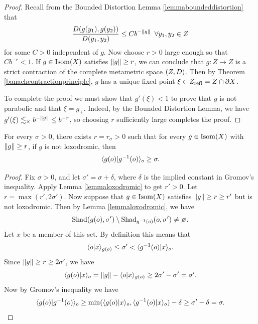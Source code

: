 \begin{proof}
Recall from the Bounded Distortion Lemma \ref{lemmaboundeddistortion} that
\begin{equation}
\label{equationloxodromic}
\frac{D(g(y_1),g(y_2))}{D(y_1,y_2)} \leq C b^{-\|g\|} \;\;\forall y_1,y_2\in Z
\end{equation}
for some $C > 0$ independent of $g$. Now choose $r > 0$ large enough so that $C b^{-r} < 1$. If $g\in\operatorname{Isom}(X)$ satisfies $\|g\|\geq r$, we can conclude that $g:Z\to Z$ is a strict contraction of the complete metametric space $(Z,D)$. Then by Theorem \ref{banachcontractionprinciple}, $g$ has a unique fixed point $\xi\in Z_{\mathrm{ref \hspace{0 in} l}} = Z\cap \partial X$.

To complete the proof we must show that $g'(\xi) < 1$ to prove that $g$ is not parabolic and that $\xi = g_+$. Indeed, by the Bounded Distortion Lemma, we have $g'(\xi) \lesssim_\times b^{-\|g\|} \leq b^{-r}$, so choosing $r$ sufficiently large completes the proof.
\end{proof}

\begin{corollary}
\label{corollaryloxodromic}
For every $\sigma > 0$, there exists $r = r_\sigma > 0$ such that for every $g\in\operatorname{Isom}(X)$ with $\|g\|\geq r$, if $g$ is not loxodromic, then
\begin{equation}
\label{nonloxodromic}
\langle g(o)|g^{-1}(o)\rangle_o \geq \sigma.
\end{equation}
\end{corollary}
\begin{proof}
Fix $\sigma > 0$, and let $\sigma' = \sigma + \delta$, where $\delta$ is the implied constant in Gromov's inequality. Apply Lemma \ref{lemmaloxodromic} to get $r' > 0$. Let $r = \max(r',2\sigma')$. Now suppose that $g\in\operatorname{Isom}(X)$ satisfies $\|g\|\geq r\geq r'$ but is not loxodromic. Then by Lemma \ref{lemmaloxodromic}, we have
\[
\Shad(g(\zero),\sigma')\butnot \Shad_{g^{-1}(\zero)}(\zero,\sigma')\neq \emptyset.
\]
Let $x$ be a member of this set. By definition this means that
\[
\langle o|x\rangle_{g(o)} \leq \sigma' < \langle g^{-1}(o)|x\rangle_o.
\]
Since $\|g\|\geq r\geq 2\sigma'$, we have
\[
\langle g(o)|x\rangle_o = \|g\| - \langle o|x\rangle_{g(o)} \geq 2\sigma' - \sigma' = \sigma'.
\]
Now by Gromov's inequality we have
\[
\langle g(o)|g^{-1}(o)\rangle_o \geq \min(\langle g(o)|x\rangle_o,\langle g^{-1}(o)|x\rangle_o) - \delta
\geq \sigma' - \delta = \sigma.
\]
\end{proof}

